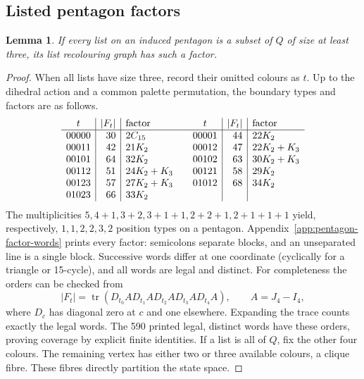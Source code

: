 \documentclass[11pt]{article}
\newtheorem{lemma}[theorem]{Lemma}
\theoremstyle{remark}
\numberwithin{equation}{section}
\begin{document}
\subsection{Listed pentagon factors}
\begin{lemma}\label{lem:pentagon-list-factor}
If every list on an induced pentagon is a subset of $Q$ of size at
least three, its list recolouring graph has such a factor.
\end{lemma}
\begin{proof}
When all lists have size three, record their omitted colours as $t$.
Up to the dihedral action and a common palette permutation, the
boundary types and factors are as follows.
\[
\begin{array}{c|r|l@{\qquad}c|r|l}
t&|F_t|&\text{factor}&t&|F_t|&\text{factor}\\\hline
00000&30&2C_{15}&00001&44&22K_2\\
00011&42&21K_2&00012&47&22K_2+K_3\\
00101&64&32K_2&00102&63&30K_2+K_3\\
00112&51&24K_2+K_3&00121&58&29K_2\\
00123&57&27K_2+K_3&01012&68&34K_2\\
01023&66&33K_2&&&
\end{array}
\]
The multiplicities $5,4+1,3+2,3+1+1,2+2+1,2+1+1+1$ yield,
respectively, $1,1,2,2,3,2$ position types on a pentagon.
Appendix~\ref{app:pentagon-factor-words} prints every factor: semicolons
separate blocks, and an unseparated line is a single block.
Successive words differ at one coordinate (cyclically for
a triangle or 15-cycle), and all words are legal and distinct.
For completeness the orders can be checked from
\[
 |F_t|=\operatorname{tr}(D_{t_0}A D_{t_1}A D_{t_2}A D_{t_3}A D_{t_4}A),
 \qquad A=J_4-I_4,
\]
where $D_c$ has diagonal zero at $c$ and one elsewhere. Expanding the
trace counts exactly the legal words. The 590 printed legal, distinct
words have these orders, proving coverage by explicit finite identities.
If a list is all of $Q$, fix the other four colours. The remaining
vertex has either two or three available colours, a clique fibre.
These fibres directly partition the state space.
\end{proof}
\end{document}
